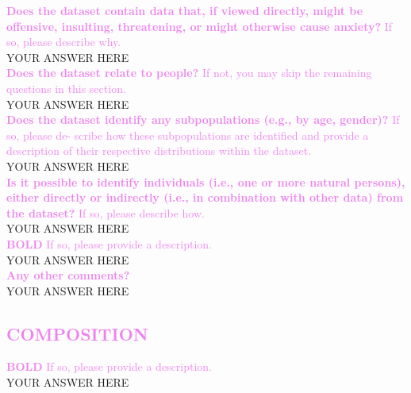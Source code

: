 \documentclass[letterpaper, 10 pt, conference]{ieeeconf}  %
\newcommand{\sectioncolor}{violet}
\begin{document}
    \textcolor{\sectioncolor}{\textbf{
    Does the dataset contain data that, if viewed directly, might be offensive, insulting, threatening, or might otherwise cause anxiety?
    }
    If so, please describe why.
    } \\
    YOUR ANSWER HERE \\
    
    \textcolor{\sectioncolor}{\textbf{
    Does the dataset relate to people?
    }
    If not, you may skip the remaining questions in this section.
    } \\
    YOUR ANSWER HERE \\
    
    \textcolor{\sectioncolor}{\textbf{
    Does the dataset identify any subpopulations (e.g., by age, gender)?
    }
    If so, please de- scribe how these subpopulations are identified and provide a description of their respective distributions within the dataset.
    } \\
    YOUR ANSWER HERE \\
    
    \textcolor{\sectioncolor}{\textbf{
    Is it possible to identify individuals (i.e., one or more natural persons), either directly or indirectly (i.e., in combination with other data) from the dataset?
    }
    If so, please describe how.
    } \\
    YOUR ANSWER HERE \\
    
    \textcolor{\sectioncolor}{\textbf{
    BOLD
    }
    If so, please provide a description.
    } \\
    YOUR ANSWER HERE \\
    
    \textcolor{\sectioncolor}{\textbf{
    Any other comments?
    }} \\
    YOUR ANSWER HERE \\

\begin{mdframed}[linecolor=\sectioncolor]
\section*{\textcolor{\sectioncolor}{COMPOSITION}}
\end{mdframed}
    
    \textcolor{\sectioncolor}{\textbf{
    BOLD
    }
    If so, please provide a description.
    } \\
    YOUR ANSWER HERE \\
    
\end{document}
